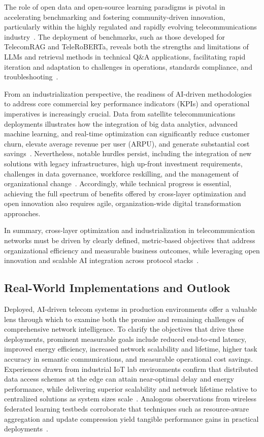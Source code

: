 \documentclass[sigconf]{acmart}
\begin{document}
The role of open data and open-source learning paradigms is pivotal in accelerating benchmarking and fostering community-driven innovation, particularly within the highly regulated and rapidly evolving telecommunications industry~\cite{ref11, ref21, ref22, ref23}. The deployment of benchmarks, such as those developed for TelecomRAG and TeleRoBERTa, reveals both the strengths and limitations of LLMs and retrieval methods in technical Q\&A applications, facilitating rapid iteration and adaptation to challenges in operations, standards compliance, and troubleshooting~\cite{ref23, ref29}.

From an industrialization perspective, the readiness of AI-driven methodologies to address core commercial key performance indicators (KPIs) and operational imperatives is increasingly crucial. Data from satellite telecommunications deployments illustrates how the integration of big data analytics, advanced machine learning, and real-time optimization can significantly reduce customer churn, elevate average revenue per user (ARPU), and generate substantial cost savings~\cite{ref49}. Nevertheless, notable hurdles persist, including the integration of new solutions with legacy infrastructures, high up-front investment requirements, challenges in data governance, workforce reskilling, and the management of organizational change~\cite{ref49}. Accordingly, while technical progress is essential, achieving the full spectrum of benefits offered by cross-layer optimization and open innovation also requires agile, organization-wide digital transformation approaches.

In summary, cross-layer optimization and industrialization in telecommunication networks must be driven by clearly defined, metric-based objectives that address organizational efficiency and measurable business outcomes, while leveraging open innovation and scalable AI integration across protocol stacks~\cite{ref14, ref23, ref49}.

\subsection{Real-World Implementations and Outlook}

Deployed, AI-driven telecom systems in production environments offer a valuable lens through which to examine both the promise and remaining challenges of comprehensive network intelligence. To clarify the objectives that drive these deployments, prominent measurable goals include reduced end-to-end latency, improved energy efficiency, increased network scalability and lifetime, higher task accuracy in semantic communications, and measurable operational cost savings. Experiences drawn from industrial IoT lab environments confirm that distributed data access schemes at the edge can attain near-optimal delay and energy performance, while delivering superior scalability and network lifetime relative to centralized solutions as system sizes scale~\cite{ref14}. Analogous observations from wireless federated learning testbeds corroborate that techniques such as resource-aware aggregation and update compression yield tangible performance gains in practical deployments~\cite{ref12}.
\end{document}
